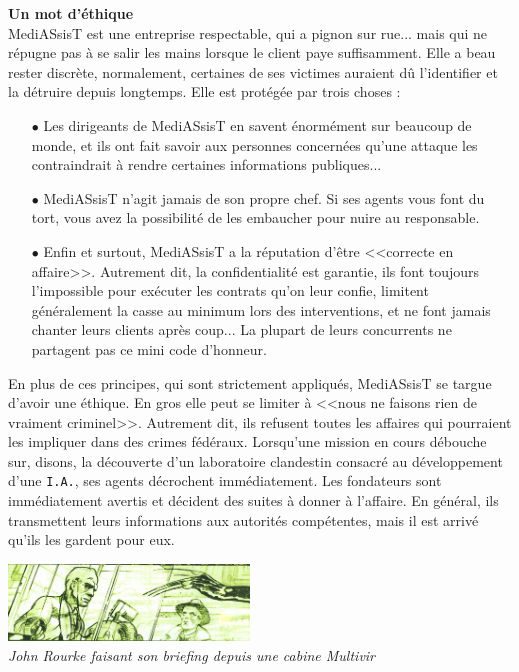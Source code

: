 \documentclass[11pt,twoside,a4paper]{article}
\begin{document}
\begin{multicols}{2}
\textbf{\Large Un mot d'{\'e}thique}~\\ 
MediASsisT est une entreprise respectable, qui a pignon sur rue... mais qui ne r{\'e}pugne pas {\`a} se salir les mains lorsque le client paye suffisamment. Elle a beau rester discr{\`e}te, normalement, certaines de ses victimes auraient d{\^u} l'identifier et la d{\'e}truire depuis longtemps. Elle est prot{\'e}g{\'e}e par trois choses : 
\begin{itemize}
	\item[$\bullet$] Les dirigeants de MediASsisT en savent {\'e}norm{\'e}ment sur beaucoup de monde, et ils ont fait savoir aux personnes concern{\'e}es qu'une attaque les contraindrait {\`a} rendre certaines informations publiques...
	\item[$\bullet$] MediASsisT n'agit jamais de son propre chef. Si ses agents vous font du tort, vous avez la possibilit{\'e} de les embaucher pour nuire au responsable. 
	\item[$\bullet$] Enfin et surtout, MediASsisT a la r{\'e}putation d'{\^e}tre <<correcte en affaire>>. Autrement dit, la confidentialit{\'e} est garantie, ils font toujours l'impossible pour ex{\'e}cuter les contrats qu'on leur confie, limitent g{\'e}n{\'e}ralement la casse au minimum lors des interventions, et ne font jamais chanter leurs clients apr{\`e}s coup... La plupart de leurs concurrents ne partagent pas ce mini code d'honneur. 
\end{itemize}
En plus de ces principes, qui sont strictement appliqu{\'e}s, MediASsisT se targue d'avoir une {\'e}thique. En gros elle peut se limiter {\`a} <<nous ne faisons rien de vraiment criminel>>. Autrement dit, ils refusent toutes les affaires qui pourraient les impliquer dans des crimes f{\'e}d{\'e}raux. Lorsqu'une mission en cours d{\'e}bouche sur, disons, la d{\'e}couverte d'un laboratoire clandestin consacr{\'e} au d{\'e}veloppement d'une \texttt{I.A.}, ses agents d{\'e}crochent imm{\'e}diatement. Les fondateurs sont imm{\'e}diatement avertis et d{\'e}cident des suites {\`a} donner {\`a} l'affaire. En g{\'e}n{\'e}ral, ils transmettent leurs informations aux autorit{\'e}s comp{\'e}tentes, mais il est arriv{\'e} qu'ils les gardent pour eux. ~\\

\begin{center} \includegraphics[width=0.48\textwidth]{img/MASTjohnRourkeMultivir.jpg}
	~\\ \emph{\footnotesize John Rourke faisant son briefing depuis une cabine Multivir\texttrademark } \end{center}


\end{multicols}
\end{document}
